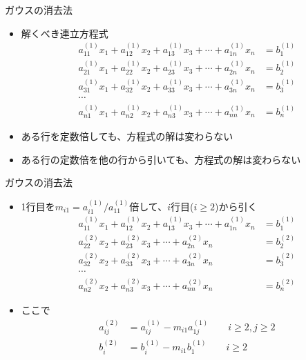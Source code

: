 \documentclass[dvipdfmx]{beamer}
\begin{document}
\begin{frame}[t,fragile]{ガウスの消去法}
  \begin{itemize}
    \setlength{\itemsep}{1em}
  \item 解くべき連立方程式
    \begin{align*}
    a_{11}^{(1)} x_1 + a_{12}^{(1)} x_2 + a_{13}^{(1)} x_3 + \cdots + a_{1n}^{(1)} x_n &= b_{1}^{(1)} \\
    a_{21}^{(1)} x_1 + a_{22}^{(1)} x_2 + a_{23}^{(1)} x_3 + \cdots + a_{2n}^{(1)} x_n &= b_{2}^{(1)} \\
    a_{31}^{(1)} x_1 + a_{32}^{(1)} x_2 + a_{33}^{(1)} x_3 + \cdots + a_{3n}^{(1)} x_n &= b_{3}^{(1)} \\
    \cdots \\
    a_{n1}^{(1)} x_1 + a_{n2}^{(1)} x_2 + a_{n3}^{(1)} x_3 + \cdots + a_{nn}^{(1)} x_n &= b_{n}^{(1)}
    \end{align*}
  \item ある行を定数倍しても、方程式の解は変わらない
  \item ある行の定数倍を他の行から引いても、方程式の解は変わらない
  \end{itemize}
\end{frame}

\begin{frame}[t,fragile]{ガウスの消去法}
  \begin{itemize}
    \setlength{\itemsep}{1em}
  \item 1行目を$m_{i1} = a_{i1}^{(1)}/a_{11}^{(1)}$倍して、$i$行目($i \ge 2$)から引く
    \begin{align*}
    a_{11}^{(1)} x_1 + a_{12}^{(1)} x_2 + a_{13}^{(1)} x_3 + \cdots + a_{1n}^{(1)} x_n &= b_{1}^{(1)} \\
    a_{22}^{(2)} x_2 + a_{23}^{(2)} x_3 + \cdots + a_{2n}^{(2)} x_n &= b_{2}^{(2)} \\
    a_{32}^{(2)} x_2 + a_{33}^{(2)} x_3 + \cdots + a_{3n}^{(2)} x_n &= b_{3}^{(2)} \\
    \cdots \\
    a_{n2}^{(2)} x_2 + a_{n3}^{(2)} x_3 + \cdots + a_{nn}^{(2)} x_n &= b_{n}^{(2)}
    \end{align*}
  \item ここで
    \begin{align*}
      a_{ij}^{(2)} &= a_{ij}^{(1)} - m_{i1} a_{1j}^{(1)} \qquad i \ge 2, j \ge 2 \\
      b_{i}^{(2)} &= b_{i}^{(1)} - m_{i1} b_{1}^{(1)} \qquad i \ge 2
    \end{align*}
  \end{itemize}
\end{frame}
\end{document}
